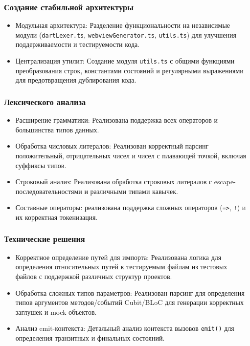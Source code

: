 \documentclass[14pt, russian]{scrartcl}
\begin{document}
\subsubsection{Создание стабильной архитектуры}
\begin{itemize}
    \item Модульная архитектура: Разделение функциональности на независимые модули (\texttt{dartLexer.ts}, \texttt{webviewGenerator.ts}, \texttt{utils.ts}) для улучшения поддерживаемости и тестируемости кода.
    \item Централизация утилит: Создание модуля \texttt{utils.ts} с общими функциями преобразования строк, константами состояний и регулярными выражениями для предотвращения дублирования кода.
\end{itemize}

\subsubsection{Лексического анализа}
\begin{itemize}
    \item Расширение грамматики: Реализована поддержка всех операторов и большинства типов данных.
    \item Обработка числовых литералов: Реализован корректный парсинг положительный, отрицательных чисел и чисел с плавающей точкой, включая суффиксы типов.
    \item Строковый анализ: Реализована обработка строковых литералов с escape-последовательностями и различными типами кавычек.
    \item Составные операторы: реализована поддержка сложных операторов (\texttt{=>}, \texttt{!}) и их корректная токенизация.
\end{itemize}

\subsubsection{Технические решения}
\begin{itemize}
    \item Корректное определение путей для импорта: Реализована логика для определения относительных путей к тестируемым файлам из тестовых файлов с поддержкой различных структур проектов.
    \item Обработка сложных типов параметров: Реализован парсинг для определения типов аргументов методов/событий Cubit/BLoC для генерации корректных заглушек и mock-объектов.
    \item Анализ emit-контекста: Детальный анализ контекста вызовов \texttt{emit()} для определения транзитных и финальных состояний.
\end{itemize}
\end{document}
